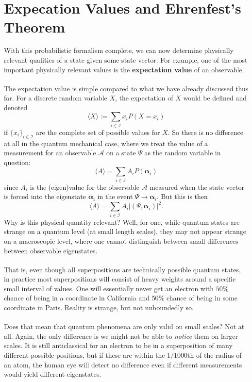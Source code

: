 \section{Expecation Values and Ehrenfest's Theorem}
With this probabilistic formalism complete, we can now determine physically relevant qualities of a state given some state vector. For example, one of the most important physically relevant values is the \textbf{expectation value} of an observable.
\\\\
The expectation value is simple compared to what we have already discussed thus far. For a discrete random variable $X$, the expectation of $X$ would be defined and denoted
$$
\langle X \rangle := \sum_{{i\in \mathcal{I}}}x_{i}P(X=x_{i})
$$
if $\{x_{i}\}_{i\in \mathcal{I}}$ are the complete set of possible values for $X$. So there is no difference at all in the quantum mechanical case, where we treat the value of a measurement for an observable $\mathcal{A}$ on a state $\Psi$ as the random variable in question:
$$
\langle A \rangle = \sum_{i\in\mathcal{I}}A_{i}P(\bm{\alpha}_{i})
$$
since $A_{i}$ is the (eigen)value for the observable $\mathcal{A}$ measured when the state vector is forced into the eigenstate $\bm{\alpha_{i}}$ in the event $\Psi \to \bm{\alpha}_{i}$. But this is then 
$$
\langle A \rangle = \sum_{i\in\mathcal{I}}A_{i}|(\Psi,\bm{\alpha}_{i})|^{2}.
$$
Why is this physical quantity relevant? Well, for one, while quantum states are strange on a quantum level (at small length scales), they may not appear strange on a macroscopic level, where one cannot distinguish between small differences between observable eigenstates.
\\\\
That is, even though all superpositions are technically possible quantum states, in practice most superpositions will consist of heavy weights around a specific small interval of values. One will essentially never get an electron with $50\%$ chance of being in a coordinate in California and $50\%$ chance of being in some coordinate in Paris. Reality is strange, but not unboundedly so.
\\\\
Does that mean that quantum phenomena are only valid on small scales? Not at all. Again, the only difference is we might not be able to \textit{notice} them on larger scales. It is still anticlassical for an electron to be in a superposition of many different possible positions, but if these are within the $1/1000$th of the radius of an atom, the human eye will detect no difference even if different measurements would yield different eigenstates.
